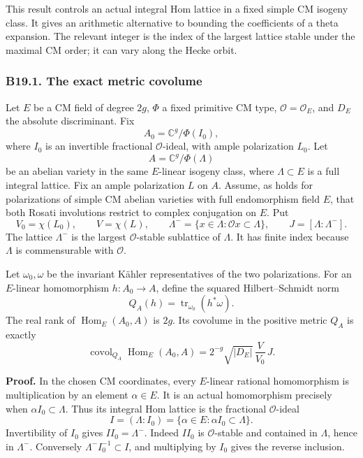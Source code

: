 This result controls an actual integral Hom lattice in a fixed simple CM isogeny class. It gives an arithmetic alternative to bounding the coefficients of a theta expansion. The relevant integer is the index of the largest lattice stable under the maximal CM order; it can vary along the Hecke orbit.

\subsubsection{B19.1. The exact metric covolume}\label{b19.1.-the-exact-metric-covolume}

Let \(E\) be a CM field of degree \(2g\), \(\Phi\) a fixed primitive CM type, \(\mathcal O=\mathcal O_E\), and \(D_E\) the absolute discriminant. Fix \[
 A_0=\mathbb C^g/\Phi(I_0),
\] where \(I_0\) is an invertible fractional \(\mathcal O\)-ideal, with ample polarization \(L_0\). Let \[
 A=\mathbb C^g/\Phi(\Lambda)
\] be an abelian variety in the same \(E\)-linear isogeny class, where \(\Lambda\subset E\) is a full integral lattice. Fix an ample polarization \(L\) on \(A\). Assume, as holds for polarizations of simple CM abelian varieties with full endomorphism field \(E\), that both Rosati involutions restrict to complex conjugation on \(E\). Put \[
 V_0=\chi(L_0),\qquad V=\chi(L),\qquad
 \Lambda^-=\{x\in\Lambda:\mathcal O x\subset\Lambda\},\qquad
 J=[\Lambda:\Lambda^-].
\tag{B19.1}
\] The lattice \(\Lambda^-\) is the largest \(\mathcal O\)-stable sublattice of \(\Lambda\). It has finite index because \(\Lambda\) is commensurable with \(\mathcal O\).

Let \(\omega_0,\omega\) be the invariant Kähler representatives of the two polarizations. For an \(E\)-linear homomorphism \(h:A_0\to A\), define the squared Hilbert--Schmidt norm \[
 Q_A(h)=\operatorname{tr}_{\omega_0}(h^*\omega).
\tag{B19.2}
\] The real rank of \(\operatorname{Hom}_E(A_0,A)\) is \(2g\). Its covolume in the positive metric \(Q_A\) is exactly \[
 \operatorname{covol}_{Q_A}\operatorname{Hom}_E(A_0,A)
 =2^{-g}\sqrt{|D_E|}\,\frac{V}{V_0}\,J.
\tag{B19.3}
\]

\textbf{Proof.} In the chosen CM coordinates, every \(E\)-linear rational homomorphism is multiplication by an element \(\alpha\in E\). It is an actual homomorphism precisely when \(\alpha I_0\subset\Lambda\). Thus its integral Hom lattice is the fractional \(\mathcal O\)-ideal \[
 I=(\Lambda:I_0)=\{\alpha\in E:\alpha I_0\subset\Lambda\}.
\] Invertibility of \(I_0\) gives \(I I_0=\Lambda^-\). Indeed \(I I_0\) is \(\mathcal O\)-stable and contained in \(\Lambda\), hence in \(\Lambda^-\). Conversely \(\Lambda^- I_0^{-1}\subset I\), and multiplying by \(I_0\) gives the reverse inclusion.

